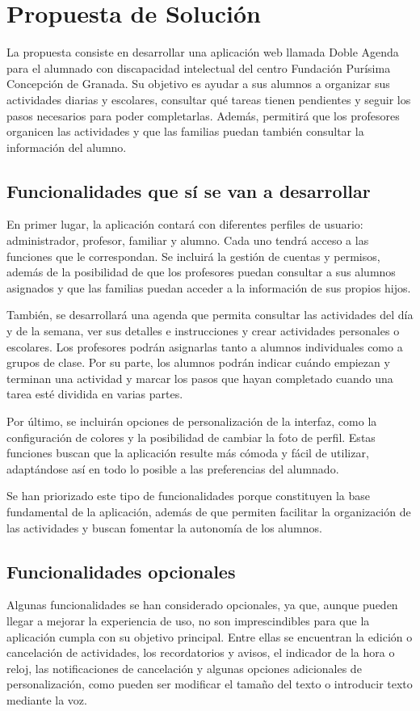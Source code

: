 \section{Propuesta de Solución}

La propuesta consiste en desarrollar una aplicación web llamada Doble Agenda para el alumnado con discapacidad intelectual del centro Fundación Purísima Concepción de Granada. Su objetivo es ayudar a sus alumnos a organizar sus actividades diarias y escolares, consultar qué tareas tienen pendientes y seguir los pasos necesarios para poder completarlas. Además, permitirá que los profesores organicen las actividades y que las familias puedan también consultar la información del alumno.

\subsection{Funcionalidades que sí se van a desarrollar}
En primer lugar, la aplicación contará con diferentes perfiles de usuario: administrador, profesor, familiar y alumno. Cada uno tendrá acceso a las funciones que le correspondan. Se incluirá la gestión de cuentas y permisos, además de la posibilidad de que los profesores puedan consultar a sus alumnos asignados y que las familias puedan acceder a la información de sus propios hijos.

También, se desarrollará una agenda que permita consultar las actividades del día y de la semana, ver sus detalles e instrucciones y crear actividades personales o escolares. Los profesores podrán asignarlas tanto a alumnos individuales como a grupos de clase. Por su parte, los alumnos podrán indicar cuándo empiezan y terminan una actividad y marcar los pasos que hayan completado cuando una tarea esté dividida en varias partes.

Por último, se incluirán opciones de personalización de la interfaz, como la configuración de colores y la posibilidad de cambiar la foto de perfil. Estas funciones buscan que la aplicación resulte más cómoda y fácil de utilizar, adaptándose así en todo lo posible a las preferencias del alumnado.

Se han priorizado este tipo de funcionalidades porque constituyen la base fundamental de la aplicación, además de que permiten facilitar la organización de las actividades y buscan fomentar la autonomía de los alumnos.

\subsection{Funcionalidades opcionales}
Algunas funcionalidades se han considerado opcionales, ya que, aunque pueden llegar a mejorar la experiencia de uso, no son imprescindibles para que la aplicación cumpla con su objetivo principal. Entre ellas se encuentran la edición o cancelación de actividades, los recordatorios y avisos, el indicador de la hora o reloj, las notificaciones de cancelación y algunas opciones adicionales de personalización, como pueden ser modificar el tamaño del texto o introducir texto mediante la voz.

